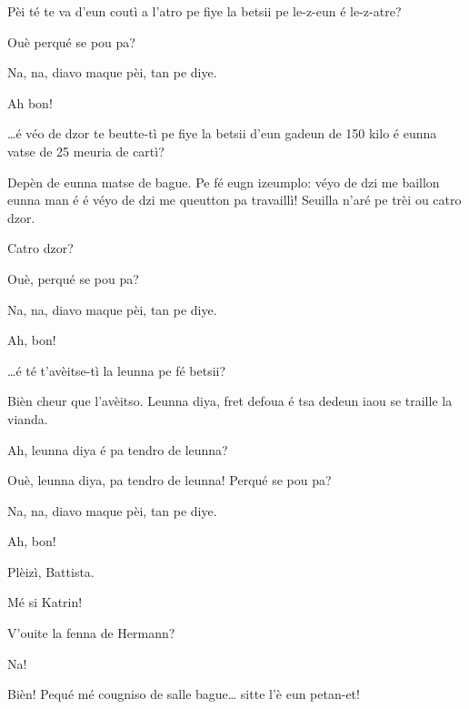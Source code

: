 \begin{drama}

\Battistaspeaks  {}Pèi té te va d’eun coutì a l’atro pe fiye la betsii pe le-z-eun é le-z-atre?

\Hermannspeaks {} Ouè perqué se pou pa?

\Battistaspeaks{}  Na, na, diavo maque pèi, tan pe diye.

\Hermannspeaks Ah bon!

\Battistaspeaks  {} \ldots é véo de dzor te beutte-tì pe fiye la betsii d’eun gadeun de 150 kilo é eunna vatse de 25 meuria de cartì?

\Hermannspeaks Depèn de eunna matse de bague. Pe fé eugn izeumplo: véyo de dzi me baillon eunna man é  é véyo de dzi me queutton pa travaillì! Seuilla n'aré pe trèi ou catro dzor.

\Battistaspeaks  Catro dzor?

\Hermannspeaks{} Ouè, perqué se pou pa?

\Battistaspeaks{}  Na, na, diavo maque pèi, tan pe diye.

\Hermannspeaks Ah, bon!

\Battistaspeaks{}\ldots é té t’avèitse-tì la leunna pe fé betsii?

\Hermannspeaks Bièn cheur que l’avèitso. Leunna diya, fret defoua é tsa dedeun iaou se traille la vianda. 

\Battistaspeaks Ah, leunna diya é pa tendro de leunna?

\Hermannspeaks {} Ouè, leunna diya, pa tendro de leunna! Perqué se pou pa?

\Battistaspeaks{}  Na, na, diavo maque pèi, tan pe diye.

\Hermannspeaks Ah, bon!


\Battistaspeaks{} Plèizì, Battista.

\Katrinspeaks{} Mé si Katrin!

\Battistaspeaks  V'ouite la fenna de Hermann?

\Katrinspeaks  Na!

\Battistaspeaks  Bièn! Pequé mé cougniso de salle bague\ldots {} sitte l’è eun petan-et!


\end{drama}
